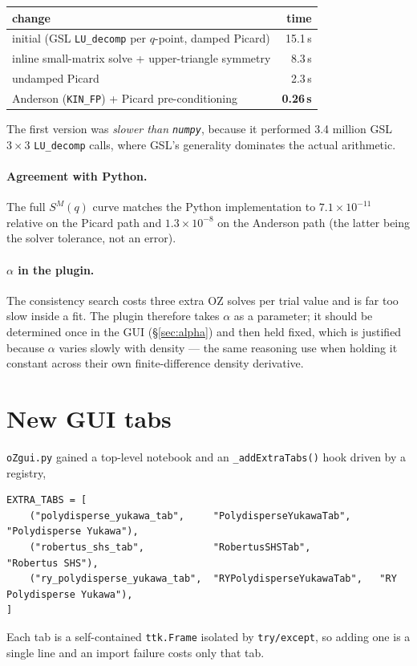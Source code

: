 \documentclass[11pt,a4paper]{article}
\newcommand{\code}[1]{\texttt{#1}}
\begin{document}
\begin{center}
\begin{tabular}{lr}
\toprule
change & time\\
\midrule
initial (GSL \code{LU\_decomp} per $q$-point, damped Picard) & 15.1\,s\\
inline small-matrix solve + upper-triangle symmetry          & 8.3\,s\\
undamped Picard                                              & 2.3\,s\\
Anderson (\code{KIN\_FP}) + Picard pre-conditioning          & \textbf{0.26\,s}\\
\bottomrule
\end{tabular}
\end{center}

The first version was \emph{slower than \code{numpy}}, because it performed
3.4 million GSL $3\times3$ \code{LU\_decomp} calls, where GSL's generality
dominates the actual arithmetic.

\paragraph{Agreement with Python.} The full $S^M(q)$ curve matches the Python
implementation to $7.1\times10^{-11}$ relative on the Picard path and
$1.3\times10^{-8}$ on the Anderson path (the latter being the solver
tolerance, not an error).

\paragraph{$\alpha$ in the plugin.} The consistency search costs three extra
OZ solves per trial value and is far too slow inside a fit. The plugin
therefore takes $\alpha$ as a parameter; it should be determined once in the
GUI (\S\ref{sec:alpha}) and then held fixed, which is justified because
$\alpha$ varies slowly with density --- the same reasoning
\cite{daguanno1991} use when holding it constant across their own
finite-difference density derivative.

\section{New GUI tabs}

\code{oZgui.py} gained a top-level notebook and an \code{\_addExtraTabs()}
hook driven by a registry,
\begin{lstlisting}[basicstyle=\ttfamily\footnotesize]
EXTRA_TABS = [
    ("polydisperse_yukawa_tab",     "PolydisperseYukawaTab",     "Polydisperse Yukawa"),
    ("robertus_shs_tab",            "RobertusSHSTab",            "Robertus SHS"),
    ("ry_polydisperse_yukawa_tab",  "RYPolydisperseYukawaTab",   "RY Polydisperse Yukawa"),
]
\end{lstlisting}
Each tab is a self-contained \code{ttk.Frame} isolated by \code{try/except},
so adding one is a single line and an import failure costs only that tab.
\end{document}

